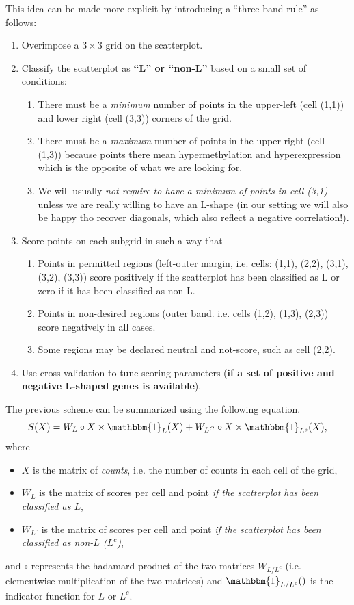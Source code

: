 \documentclass[a4paper,10pt]{article}\usepackage[]{graphicx}\usepackage[]{color}
\begin{document}
This idea can be made more explicit by introducing a ``three-band rule'' as follows:
\begin{enumerate}
\item Overimpose a $3\times 3$ grid on the scatterplot.
\item Classify the scatterplot as \textbf{``L'' or ``non-L''} based on a small set of conditions:
\begin{enumerate}
  \item There must be a \emph{minimum} number of points in the upper-left (cell (1,1)) and lower right (cell (3,3)) corners of the grid.
  \item There must be a \emph{maximum} number of points in the upper right (cell (1,3)) because points there mean hypermethylation and hyperexpression which is the opposite of what we are looking for.
  \item We will usually \emph{not require to have a minimum of points in cell (3,1)} unless we are really willing to have an L-shape (in our setting we will also be happy tho recover diagonals, which also reflect a negative correlation!).
\end{enumerate}

\item Score points on each subgrid in such a way that
\begin{enumerate}
	\item Points in permitted regions (left-outer margin, i.e. cells: (1,1), (2,2), (3,1), (3,2), (3,3)) score positively if the scatterplot has been classified as L or zero if it has been classified as non-L.
	\item Points in non-desired regions (outer band. i.e. cells (1,2), (1,3), (2,3)) score negatively in all cases.
	\item Some regions may be declared neutral and not-score, such as cell (2,2).
\end{enumerate}
\item Use cross-validation to tune scoring parameters (\textbf{if a set of positive and negative L-shaped genes is available}).
\end{enumerate}

The previous scheme can be summarized using the following equation.
\begin{equation}
S(X) = W_L \circ X \times \mathbbm{1}_L(X) + W_{L^C} \circ X \times \mathbbm{1}_{L^c}(X),
\end{equation}
where
\begin{itemize}
\item ${X}$ is the matrix of \emph{counts}, i.e. the number of counts in each cell of the grid,
\item ${W_L}$ is the matrix of scores per cell and point \emph{if the scatterplot has been classified as $L$},
\item ${W_{L^c}}$ is the matrix of scores per cell and point \emph{if the scatterplot has been classified as non-$L$ ($L^c$)},
\end{itemize}
and $\circ$ represents the hadamard product of the two matrices $W_{L/L^c}$ (i.e. elementwise multiplication of the two matrices) and $\mathbbm{1}_{L/L^c}()$ is the indicator function for $L$ or $L^c$.
\end{document}
